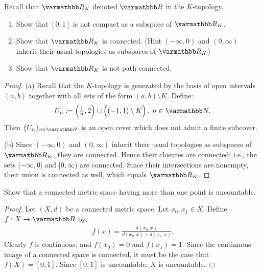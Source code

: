 \documentclass[10pt,oneside,openany]{memoir}
\begin{document}
\begin{exercise}[manual-num={3}]
Recall that $\bfR_K$ denoted $\bfR$ in the $K$-topology.
\begin{enumerate}[label = (\alph*),itemsep=1pt,topsep=3pt]
    \item Show that $[0,1]$ is not compact as a subspace of $\bfR_K$.
    \item Show that $\bfR_K$ is connected. (Hint $(-\infty,0)$ and $(0,\infty)$ inherit their usual topologies as subspaces of $\bfR_K$)
    \item Show that $\bfR_K$ is not path connected.
\end{enumerate}
\end{exercise}
    \begin{proof}
        (a) Recall that the $K$-topology is generated by the basis of open intervals $(a,b)$ together with all sets of the form $(a,b) \setminus K$. Define:
            \begin{equation*}
            \begin{split}
                U_n := \Bigl({\ts\frac{1}{n}} ,2\Bigr) \cup \Bigl((-1,1)\setminus K\Bigr)\h1, \h3 n \in \bfN.
            \end{split}
            \end{equation*}
        Then $\{U_n\}_{n \in \bfN}$ is an open cover which does not admit a finite subcover.

        (b) Since $(-\infty,0)$ and $(0,\infty)$ inherit their usual topologies as subspaces of $\bfR_K$, they are connected. Hence their closures are connected; i.e., the sets $(-\infty,0]$ and $[0,\infty)$ are connected. Since their intersections are nonempty, their union is connected as well, which equals $\bfR_K$.

    \end{proof}

\begin{exercise}[manual-num={4}]
Show that a connected metric space having more than one point is uncountable.
\end{exercise}
    \begin{proof}
        Let $(X,d)$ be a connected metric space. Let $x_0,x_1 \in X$. Define $f:X \rightarrow \bfR$ by:
            \begin{equation*}
            \begin{split}
                f(x) = \frac{d(x_0,x)}{d(x_0,x) + d(x_1,x)}.
            \end{split}
            \end{equation*}
        Clearly $f$ is continuous, and $f(x_0) = 0$ and $f(x_1) = 1$. Since the continuous image of a connected space is connected, it must be the case that $f(X) = [0,1]$. Since $[0,1]$ is uncountable, $X$ is uncountable.
    \end{proof}
\end{document}
